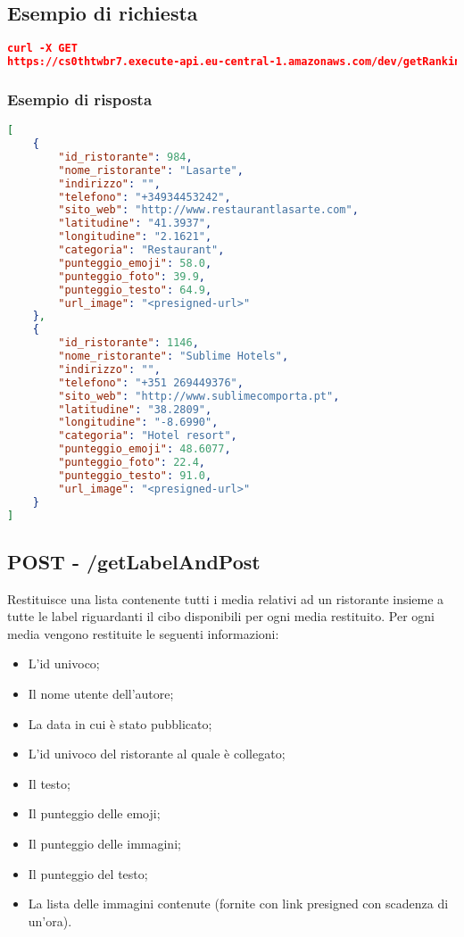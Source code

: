 \subsection{Esempio di richiesta}
\begin{lstlisting}[language=json]
curl -X GET 
https://cs0thtwbr7.execute-api.eu-central-1.amazonaws.com/dev/getRanking?from=5&size=2

\end{lstlisting}

\subsubsection{Esempio di risposta}
\begin{lstlisting}[language=json]
[
    {
        "id_ristorante": 984,
        "nome_ristorante": "Lasarte",
        "indirizzo": "",
        "telefono": "+34934453242",
        "sito_web": "http://www.restaurantlasarte.com",
        "latitudine": "41.3937",
        "longitudine": "2.1621",
        "categoria": "Restaurant",
        "punteggio_emoji": 58.0,
        "punteggio_foto": 39.9,
        "punteggio_testo": 64.9,
        "url_image": "<presigned-url>"
    },
    {
        "id_ristorante": 1146,
        "nome_ristorante": "Sublime Hotels",
        "indirizzo": "",
        "telefono": "+351 269449376",
        "sito_web": "http://www.sublimecomporta.pt",
        "latitudine": "38.2809",
        "longitudine": "-8.6990",
        "categoria": "Hotel resort",
        "punteggio_emoji": 48.6077,
        "punteggio_foto": 22.4,
        "punteggio_testo": 91.0,
        "url_image": "<presigned-url>"
    }
]
\end{lstlisting}

\pagebreak


\subsection{POST - /getLabelAndPost} 
Restituisce una lista contenente tutti i media relativi ad un ristorante insieme a tutte le label riguardanti il cibo disponibili per ogni media restituito. Per ogni media vengono restituite le seguenti informazioni:
\begin{itemize}
	\item L'id univoco;
    \item Il nome utente dell'autore;
    \item La data in cui è stato pubblicato;
    \item L'id univoco del ristorante al quale è collegato;
    \item Il testo;
    \item Il punteggio delle emoji;
    \item Il punteggio delle immagini;
    \item Il punteggio del testo;
	\item La lista delle immagini contenute (fornite con link presigned con scadenza di un'ora).
\end{itemize}

